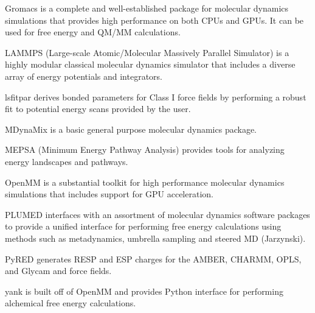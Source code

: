 Gromacs \cite{Pronk_2013} is a complete and well-established package for molecular dynamics simulations that provides high performance on both CPUs and GPUs.  It can be used for free energy and QM/MM calculations.

LAMMPS  (Large-scale Atomic/Molecular Massively Parallel Simulator) \cite{Plimpton_1995} is a highly modular classical molecular dynamics simulator that includes a diverse array of energy potentials and integrators.

lsfitpar \cite{Vanommeslaeghe_2015} derives bonded parameters for Class I force fields by performing a robust fit to potential energy scans provided by the user.

MDynaMix \cite{Lyubartsev_2000} is a basic general purpose molecular dynamics package.

MEPSA (Minimum Energy Pathway Analysis) \cite{Marcos_Alcalde_2015} provides tools for analyzing energy landscapes and pathways.

OpenMM  \cite{Eastman_2013} is a substantial toolkit for high performance molecular dynamics simulations that includes support for GPU acceleration.

PLUMED \cite{Tribello_2014} interfaces with an assortment of molecular dynamics software packages to provide a unified interface for performing free energy calculations using methods such as metadynamics, umbrella sampling and steered MD (Jarzynski).

PyRED \cite{Dupradeau_2010} generates RESP and ESP charges for the AMBER, CHARMM, OPLS, and Glycam and force fields.

yank is built off of OpenMM and provides Python interface for performing alchemical free energy calculations.